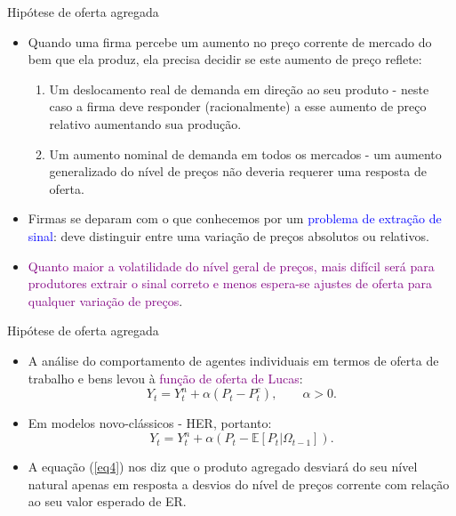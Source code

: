 \documentclass[10pt]{beamer}
\begin{document}
\begin{frame}{Hipótese de oferta agregada}
    \begin{itemize}
        \item Quando uma firma percebe um aumento no preço corrente de mercado do bem que ela produz, ela precisa decidir se este aumento de preço reflete:
        \bigskip
        \begin{enumerate}
            \item Um deslocamento real de demanda em direção ao seu produto - neste caso a firma deve responder (racionalmente) a esse aumento de preço relativo aumentando sua produção.
            \bigskip
            \item Um aumento nominal de demanda em todos os mercados - um aumento generalizado do nível de preços não deveria requerer uma resposta de oferta.
        \end{enumerate}
        \bigskip
        \item Firmas se deparam com o que conhecemos por um \textcolor{blue}{problema de extração de sinal}: deve distinguir entre uma variação de preços absolutos ou relativos.
        \bigskip
        \item \textcolor{purple}{Quanto maior a volatilidade do nível geral de preços, mais difícil será para produtores extrair o sinal correto e menos espera-se ajustes de oferta para qualquer variação de preços}.
    \end{itemize}
\end{frame}

\begin{frame}{Hipótese de oferta agregada}
    \begin{itemize}
        \item A análise do comportamento de agentes individuais em termos de oferta de trabalho e bens levou à \textcolor{purple}{função de oferta de Lucas}:
        \begin{equation}
            Y_t = Y_t^n + \alpha(P_t - P_t^e), \qquad \alpha > 0.
            \label{eq3}
        \end{equation}
        \bigskip
        \item Em modelos novo-clássicos - HER, portanto:
        \begin{equation}
            Y_t = Y_t^n + \alpha\left(P_t - \mathbb{E}[P_t|\Omega_{t-1}]\right).
            \label{eq4}
        \end{equation}
        \bigskip
        \item A equação (\ref{eq4}) nos diz que o produto agregado desviará do seu nível natural apenas em resposta a desvios do nível de preços corrente com relação ao seu valor esperado de ER.
    \end{itemize}
\end{frame}
\end{document}
